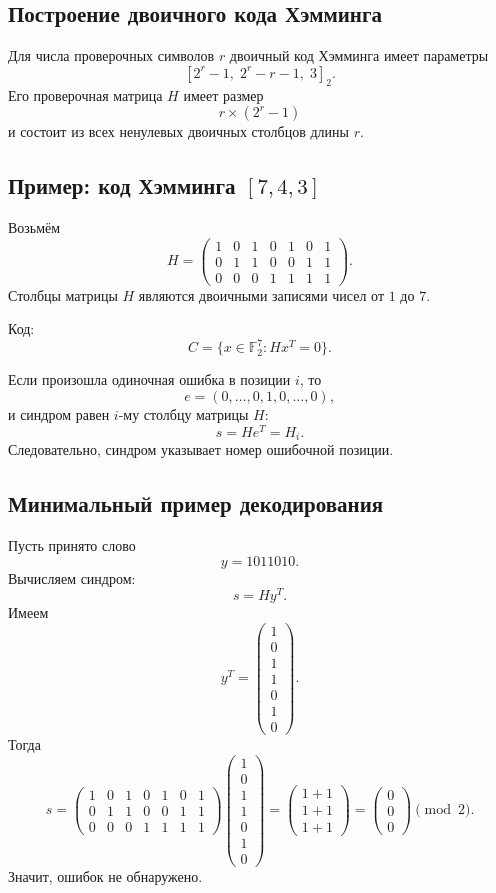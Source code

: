 \documentclass[12pt,a4paper]{article}
\newcommand{\F}{\mathbb{F}}
\begin{document}
\subsection{Построение двоичного кода Хэмминга}

Для числа проверочных символов $r$ двоичный код Хэмминга имеет параметры
\[
    [2^r-1,\;2^r-r-1,\;3]_2.
\]
Его проверочная матрица $H$ имеет размер
\[
    r\times (2^r-1)
\]
и состоит из всех ненулевых двоичных столбцов длины $r$.

\subsection{Пример: код Хэмминга \texorpdfstring{$[7,4,3]$}{[7,4,3]}}

Возьмём
\[
H=
\begin{pmatrix}
1&0&1&0&1&0&1\\
0&1&1&0&0&1&1\\
0&0&0&1&1&1&1
\end{pmatrix}.
\]
Столбцы матрицы $H$ являются двоичными записями чисел от $1$ до $7$.

Код:
\[
    C=\{x\in \F_2^7:Hx^T=0\}.
\]

Если произошла одиночная ошибка в позиции $i$, то
\[
    e=(0,\dots,0,1,0,\dots,0),
\]
и синдром равен $i$-му столбцу матрицы $H$:
\[
    s=He^T=H_i.
\]
Следовательно, синдром указывает номер ошибочной позиции.

\subsection{Минимальный пример декодирования}

Пусть принято слово
\[
    y=1011010.
\]
Вычисляем синдром:
\[
s=Hy^T.
\]
Имеем
\[
y^T=
\begin{pmatrix}
1\\0\\1\\1\\0\\1\\0
\end{pmatrix}.
\]
Тогда
\[
s=
\begin{pmatrix}
1&0&1&0&1&0&1\\
0&1&1&0&0&1&1\\
0&0&0&1&1&1&1
\end{pmatrix}
\begin{pmatrix}
1\\0\\1\\1\\0\\1\\0
\end{pmatrix}
=
\begin{pmatrix}
1+1\\
1+1\\
1+1
\end{pmatrix}
=
\begin{pmatrix}
0\\0\\0
\end{pmatrix}
\pmod 2.
\]
Значит, ошибок не обнаружено.
\end{document}

